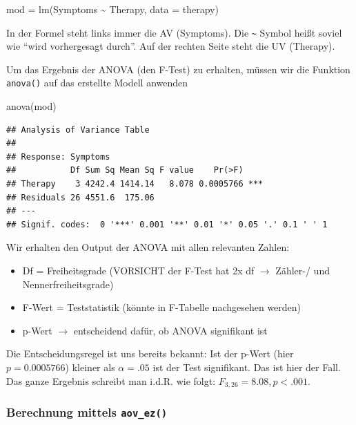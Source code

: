 \documentclass[
]{book}
\newenvironment{Shaded}{\begin{snugshade}}{\end{snugshade}}
\newcommand{\AttributeTok}[1]{\textcolor[rgb]{0.77,0.63,0.00}{#1}}
\newcommand{\FunctionTok}[1]{\textcolor[rgb]{0.00,0.00,0.00}{#1}}
\newcommand{\NormalTok}[1]{#1}
\newcommand{\OtherTok}[1]{\textcolor[rgb]{0.56,0.35,0.01}{#1}}
\newcommand{\SpecialCharTok}[1]{\textcolor[rgb]{0.00,0.00,0.00}{#1}}
\providecommand{\tightlist}{%
  \setlength{\itemsep}{0pt}\setlength{\parskip}{0pt}}
\begin{document}
\begin{Shaded}
\begin{Highlighting}[]
\NormalTok{mod }\OtherTok{=} \FunctionTok{lm}\NormalTok{(Symptoms }\SpecialCharTok{\textasciitilde{}}\NormalTok{ Therapy, }\AttributeTok{data =}\NormalTok{ therapy)}
\end{Highlighting}
\end{Shaded}

In der Formel steht links immer die AV (Symptoms). Die \texttt{\textasciitilde{}} Symbol heißt soviel wie ``wird vorhergesagt durch''. Auf der rechten Seite steht die UV (Therapy).

Um das Ergebnis der ANOVA (den F-Test) zu erhalten, müssen wir die Funktion \texttt{anova()} auf das erstellte Modell anwenden

\begin{Shaded}
\begin{Highlighting}[]
\FunctionTok{anova}\NormalTok{(mod)}
\end{Highlighting}
\end{Shaded}

\begin{verbatim}
## Analysis of Variance Table
## 
## Response: Symptoms
##           Df Sum Sq Mean Sq F value    Pr(>F)    
## Therapy    3 4242.4 1414.14   8.078 0.0005766 ***
## Residuals 26 4551.6  175.06                      
## ---
## Signif. codes:  0 '***' 0.001 '**' 0.01 '*' 0.05 '.' 0.1 ' ' 1
\end{verbatim}

Wir erhalten den Output der ANOVA mit allen relevanten Zahlen:

\begin{itemize}
\tightlist
\item
  Df = Freiheitsgrade (VORSICHT der F-Test hat 2x df \(\rightarrow\) Zähler-/ und Nennerfreiheitsgrade)
\item
  F-Wert = Teststatistik (könnte in F-Tabelle nachgesehen werden)
\item
  p-Wert \(\rightarrow\) entscheidend dafür, ob ANOVA signifikant ist
\end{itemize}

Die Entscheidungsregel ist uns bereits bekannt: Ist der p-Wert (hier \(p=0.0005766\)) kleiner als \(\alpha=.05\) ist der Test signifikant. Das ist hier der Fall. Das ganze Ergebnis schreibt man i.d.R. wie folgt: \(F_{3,26}=8.08, p<.001\).

\hypertarget{berechnung-mittels-aov_ez}{%
\subsubsection{\texorpdfstring{Berechnung mittels \texttt{aov\_ez()}}{Berechnung mittels aov\_ez()}}\label{berechnung-mittels-aov_ez}}
\end{document}
